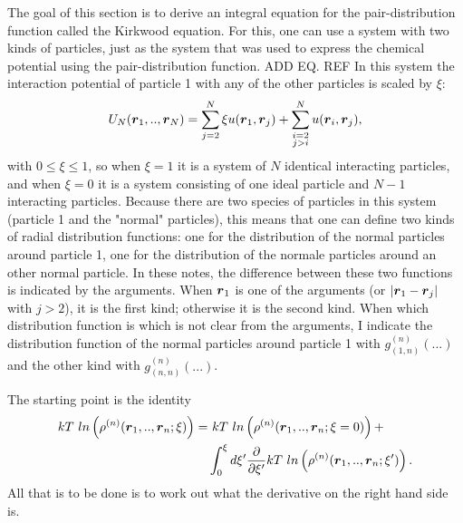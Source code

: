 
The goal of this section is to derive an integral equation for the pair-distribution function called the Kirkwood equation.
For this, one can use a system with two kinds of particles,
just as the system that was used to express the chemical potential using the pair-distribution function. ADD EQ. REF
In this system the interaction potential of particle 1 with any of the other particles is scaled by $\xi$:
\begin{align}
U_N(\boldsymbol{r}_1,..,\boldsymbol{r}_N) = \sum_{j=2}^{N} \xi u(\boldsymbol{r}_1,\boldsymbol{r}_j)
+ \sum_{\substack{i=2 \\ j>i}}^N u(\boldsymbol{r}_i,\boldsymbol{r}_j),
\end{align}
with $0 \leq \xi \leq 1$,
so when $\xi = 1$ it is a system of $N$ identical interacting particles,
and when $\xi = 0$ it is a system consisting of one ideal particle and $N-1$ interacting particles.
Because there are two species of particles in this system (particle 1 and the 
"normal" particles),
this means that one can define two kinds of radial distribution functions:
one for the distribution of the normal particles around particle 1,
one for the distribution of the normale particles around an other normal particle.
In these notes, the difference between these two functions is indicated by the arguments.
When $\boldsymbol{r}_1$ is one of the arguments (or $|\boldsymbol{r}_1 - \boldsymbol{r}_j|$ with $j>2$),
it is the first kind; otherwise it is the second kind.
When which distribution function is which is not clear from the arguments,
I indicate the distribution function of the normal particles around particle 1 with
$g^{(n)}_{(1,n)}(...)$ and the other kind with $g^{(n)}_{(n,n)}(...)$.

The starting point is the identity
\begin{align}
kT~ln\left(\rho^{(n)}(\boldsymbol{r}_1,..,\boldsymbol{r}_n;\xi)\right) =
&~ kT~ln\left(\rho^{(n)}(\boldsymbol{r}_1,..,\boldsymbol{r}_n;\xi=0)\right) + \nonumber \\
& \int_0^\xi d\xi' \frac{\partial}{\partial \xi'}
kT~ln\left(\rho^{(n)}(\boldsymbol{r}_1,..,\boldsymbol{r}_n;\xi')\right).
\end{align}
All that is to be done is to work out what the derivative on the right hand side is.



